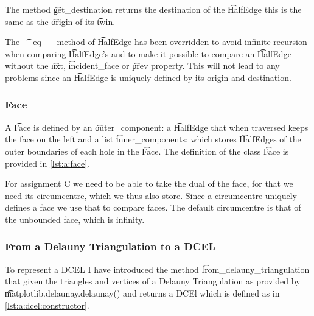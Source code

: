 	The method \t{get_destination} returns the destination of the \t{HalfEdge} this is the same as the \t{origin} of its \t{twin}.

	The \t{__eq__} method of \t{HalfEdge} has been overridden to avoid infinite recursion when comparing \t{HalfEdge}'s and to make it possible to compare an \t{HalfEdge} without the \t{nxt}, \t{incident_face} or \t{prev} property. This will not lead to any problems since an \t{HalfEdge} is uniquely defined by its origin and destination.

	

\subsubsection*{Face}
	A \t{Face} is defined by an \t{outer_component}: a \t{HalfEdge} that when traversed keeps the face on the left and a list \t{inner_components}: which stores \t{HalfEdge}s of the outer boundaries of each hole in the \t{Face}. The definition of the class \t{Face} is provided in \autoref{lst:a:face}. 

	For assignment C we need to be able to take the dual of the face, for that we need its circumcentre, which we thus also store. Since a circumcentre uniquely defines a face we use that to compare faces. The default circumcentre is that of the unbounded face, which is infinity.

	

\subsubsection*{From a Delauny Triangulation to a DCEL}
	To represent a DCEL I have introduced the method \t{from_delauny_triangulation} that given the triangles and vertices of a Delauny Triangulation as provided by \t{matplotlib.delaunay.delaunay()} and returns a DCEl which is defined as in \autoref{lst:a:dcel:constructor}. 

	

